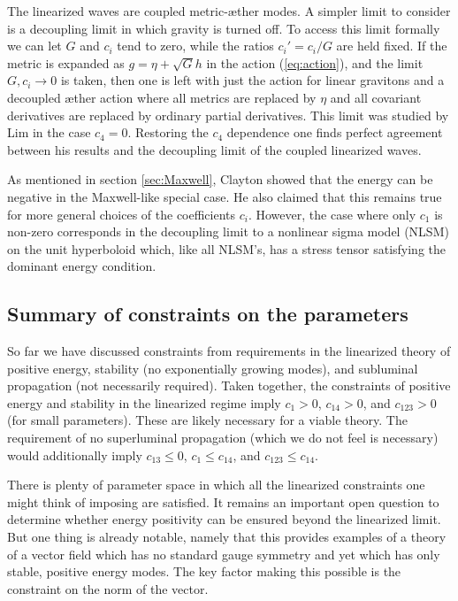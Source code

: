 \documentclass[aps]{ws-procs9x6}
\begin{document}
The linearized waves are coupled metric-{\ae}ther modes. A
simpler limit to consider is a decoupling limit in which gravity
is turned off. To access this limit formally we can let $G$ and
$c_i$ tend to zero, while the ratios $c_i'=c_i/G$ are held fixed.
If the metric is expanded as $g=\eta+\sqrt{G} h$ in the action
(\ref{eq:action}), and the limit $G,c_i\rightarrow0$ is taken,
then one is left with just the action for linear gravitons and a
decoupled {\ae}ther action where all metrics are replaced by
$\eta$ and all covariant derivatives are replaced by ordinary
partial derivatives. This limit was studied by Lim\cite{Lim} in
the case $c_4=0$. Restoring the $c_4$ dependence one finds perfect
agreement between his results and the decoupling limit of the
coupled linearized waves.

As mentioned in section \ref{sec:Maxwell}, Clayton showed that
the energy can be negative in the Maxwell-like special case. He
also claimed that this remains true for more general choices of
the coefficients $c_i$. However, the case where only $c_1$ is
non-zero corresponds in the decoupling limit to a nonlinear sigma
model (NLSM) on the unit hyperboloid which, like all NLSM's, has
a stress tensor satisfying the dominant energy condition.

\subsection{Summary of constraints on the parameters}

So far we have discussed constraints from requirements in the
linearized theory of positive energy, stability (no exponentially
growing modes), and subluminal propagation (not necessarily
required). Taken together, the constraints of positive energy and
stability in the linearized regime imply $c_1>0$, $c_{14}>0$, and
$c_{123}>0$ (for small parameters). These are likely necessary
for a viable theory. The requirement of no superluminal
propagation (which we do not feel is necessary) would
additionally imply $c_{13}\le0$, $c_1\le c_{14}$, and $c_{123}\le
c_{14}$.

There is plenty of parameter space in which all the linearized
constraints one might think of imposing are satisfied. It remains
an important open question to determine whether energy positivity
can be ensured beyond the linearized limit. But one thing is
already notable, namely that this provides examples of a theory of
a vector field which has no standard gauge symmetry and yet which
has only stable, positive energy modes. The key factor making this
possible is the constraint on the norm of the vector.
\end{document}
